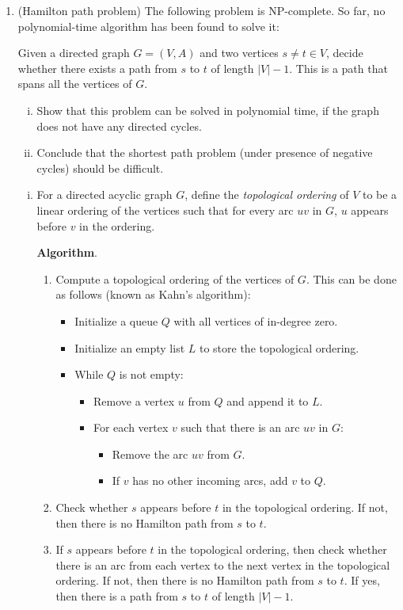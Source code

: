 \documentclass[11pt]{article}
\begin{document}
\begin{enumerate}[1)]
\item \label{hamilton} (Hamilton path problem) The following problem is NP-complete. So far, no polynomial-time algorithm has been found to solve it:

  Given a directed graph $G = (V,A)$ and two vertices $s≠t ∈ V$, decide whether there exists a path from $s$ to $t$ of length $|V|-1$. This is a path that spans all the vertices of $G$.

  \begin{enumerate}[i)] 
  \item  Show that this problem can be solved in polynomial time, if the graph does not have any directed cycles.
  \item Conclude that the shortest path problem (under presence of negative  cycles) should be difficult. 
  \end{enumerate}

\begin{solution}
\begin{enumerate}[i)]
\item 
For a directed acyclic graph \(G\), define the \emph{topological ordering} of $V$ to be a linear ordering of the vertices such that for every arc \(uv\) in \(G\), \(u\) appears before \(v\) in the ordering.

\textbf{Algorithm}.
\begin{enumerate}[1.]
  \item Compute a topological ordering of the vertices of \(G\). This can be done as follows (known as Kahn's algorithm):
  \begin{itemize}
    \item Initialize a queue \(Q\) with all vertices of in-degree zero.
    \item Initialize an empty list \(L\) to store the topological ordering.
    \item While \(Q\) is not empty:
    \begin{itemize}
      \item Remove a vertex \(u\) from \(Q\) and append it to \(L\).
      \item For each vertex \(v\) such that there is an arc \(uv\) in \(G\):
      \begin{itemize}
        \item Remove the arc \(uv\) from \(G\).
        \item If \(v\) has no other incoming arcs, add \(v\) to \(Q\).
      \end{itemize}
    \end{itemize}
  \end{itemize}
  \item Check whether \(s\) appears before \(t\) in the topological ordering. If not, then there is no Hamilton path from \(s\) to \(t\).
  \item If \(s\) appears before \(t\) in the topological ordering, then check whether there is an arc from each vertex to the next vertex in the topological ordering. If not, then there is no Hamilton path from \(s\) to \(t\). If yes, then there is a path from \(s\) to \(t\) of length \(|V|-1\).
\end{enumerate}


\end{enumerate}
\end{solution}
\end{enumerate}
\end{document}
